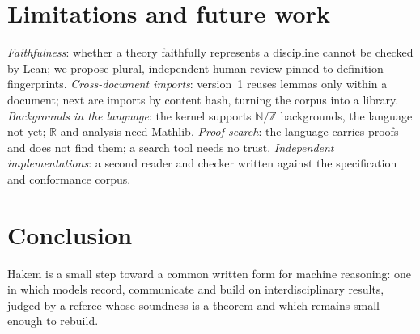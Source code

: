 \documentclass[11pt]{article}
\begin{document}
\section{Limitations and future work}

\emph{Faithfulness}: whether a theory faithfully represents a discipline cannot be checked by
Lean; we propose plural, independent human review pinned to definition fingerprints.
\emph{Cross-document imports}: version~1 reuses lemmas only within a document; next are
imports by content hash, turning the corpus into a library. \emph{Backgrounds in the
language}: the kernel supports $\mathbb{N}/\mathbb{Z}$ backgrounds, the language not yet;
$\mathbb{R}$ and analysis need Mathlib. \emph{Proof search}: the language carries proofs and
does not find them; a search tool needs no trust. \emph{Independent implementations}: a second
reader and checker written against the specification and conformance corpus.

\section{Conclusion}

Hakem is a small step toward a common written form for machine reasoning: one in which models
record, communicate and build on interdisciplinary results, judged by a referee whose
soundness is a theorem and which remains small enough to rebuild.



\end{document}
